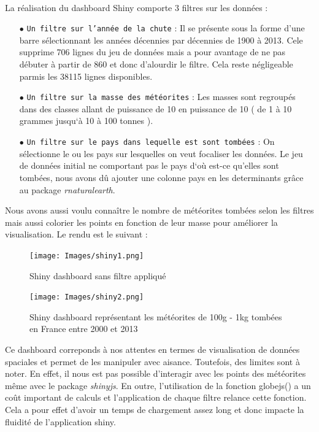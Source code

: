 \documentclass[12pt]{article}
\begin{document}
\\
La réalisation du dashboard Shiny comporte 3 filtres sur les données :\\
\begin{itemize}
    \item[$\bullet$] \texttt{Un filtre sur l'année de la chute} : Il se présente sous la forme d'une barre sélectionnant les années décennies par décennies de 1900 à 2013. Cele supprime 706 lignes du jeu de données mais a pour avantage de ne pas débuter à partir de 860 et donc d'alourdir le filtre. Cela reste négligeable parmis les 38115 lignes disponibles.\\
    \item[$\bullet$] \texttt{Un filtre sur la masse des météorites} : Les masses sont regroupés dans des classes allant de puissance de 10 en puissance de 10 ( de 1 à 10 grammes jusqu`à 10 à 100 tonnes ).\\
    \item[$\bullet$] \texttt{Un filtre sur le pays dans lequelle est sont tombées} : On sélectionne le ou les pays sur lesquelles on veut focaliser les données. Le jeu de données initial ne comportant pas le pays d`où est-ce qu'elles sont tombées, nous avons dû ajouter une colonne pays en les determinants grâce au package \textit{rnaturalearth}.
\end{itemize}
\vspace{0.3cm}
Nous avons aussi voulu connaître le nombre de météorites tombées selon les filtres mais aussi colorier les points en fonction de leur masse pour améliorer la visualisation. Le rendu est le suivant :\\
\begin{figure}[H]
    \centering
    \texttt{[image: Images/shiny1.png]}
        \caption{Shiny dashboard sans filtre appliqué}
\end{figure}

\begin{figure}[H]
    \centering
    \texttt{[image: Images/shiny2.png]}
    \caption{Shiny dashboard représentant les météorites de 100g - 1kg tombées en France entre 2000 et 2013}
\end{figure}
\vspace{0.3cm}
Ce dashboard correponds à nos attentes en termes de visualisation de données spaciales et permet de les manipuler avec aisance. Toutefois, des limites sont à noter. En effet, il nous est pas possible d'interagir avec les points des météorites même avec le package \textit{shinyjs}. En outre, l'utilisation de la fonction globejs() a un coût important de calculs et l'application de chaque filtre relance cette fonction. Cela a pour effet d'avoir un temps de chargement assez long et donc impacte la fluidité de l'application shiny.\\
\\
\end{document}
